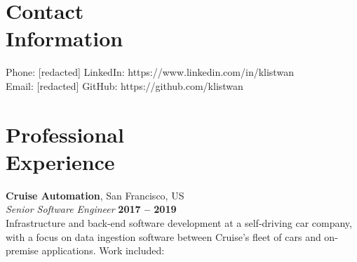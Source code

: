 \documentclass[margin,line]{resume}
\begin{document}
\begin{resume}
    \section{\mysidestyle Contact\\Information}

    Phone: [redacted]       \hfill LinkedIn: https://www.linkedin.com/in/klistwan \\
    \noindent Email: [redacted]  \hfill GitHub: https://github.com/klistwan \vspace{0mm}\\\vspace{-4.5mm}

    \section{\mysidestyle Professional\\Experience}

    \textbf{Cruise Automation}, San Francisco, US \vspace{1mm}\\\vspace{1mm}%
    \textsl{Senior Software Engineer} \hfill \textbf{2017 -- 2019}\\
    Infrastructure and back-end software development at a self-driving car company, with a focus on data ingestion software between Cruise's fleet of cars and on-premise applications. Work included:


\end{resume}
\end{document}
